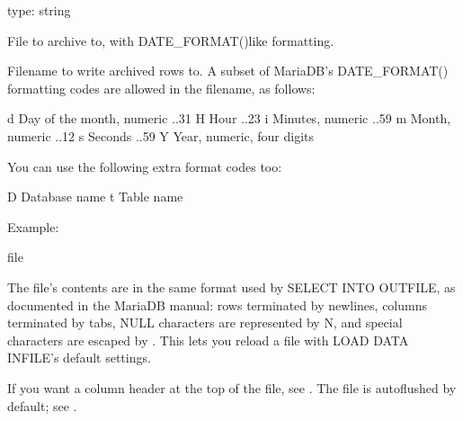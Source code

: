 \documentclass[letterpaper,10pt,english]{sphinxmanual}
\begin{document}
\begin{fulllineitems}
\label{\detokenize{mariadb-archiver:cmdoption-mariadb-archiver-file}}
\sphinxAtStartPar
type: string

\sphinxAtStartPar
File to archive to, with DATE\_FORMAT()\sphinxhyphen{}like formatting.

\sphinxAtStartPar
Filename to write archived rows to.  A subset of MariaDB’s DATE\_FORMAT()
formatting codes are allowed in the filename, as follows:

\begin{sphinxVerbatim}[commandchars=\\\{\}]
\PYGZpc{}d    Day of the month, numeric ..31
\PYGZpc{}H    Hour ..23
\PYGZpc{}i    Minutes, numeric ..59
\PYGZpc{}m    Month, numeric ..12
\PYGZpc{}s    Seconds ..59
\PYGZpc{}Y    Year, numeric, four digits
\end{sphinxVerbatim}

\sphinxAtStartPar
You can use the following extra format codes too:

\begin{sphinxVerbatim}[commandchars=\\\{\}]
\PYGZpc{}D    Database name
\PYGZpc{}t    Table name
\end{sphinxVerbatim}

\sphinxAtStartPar
Example:

\begin{sphinxVerbatim}[commandchars=\\\{\}]
\PYGZhy{}\PYGZhy{}file 
\end{sphinxVerbatim}

\sphinxAtStartPar
The file’s contents are in the same format used by SELECT INTO OUTFILE, as
documented in the MariaDB manual: rows terminated by newlines, columns
terminated by tabs, NULL characters are represented by N, and special
characters are escaped by .  This lets you reload a file with LOAD DATA
INFILE’s default settings.

\sphinxAtStartPar
If you want a column header at the top of the file, see {\hyperref[\detokenize{mariadb-archiver:cmdoption-mariadb-archiver-header}]{}}.  The file
is auto\sphinxhyphen{}flushed by default; see {\hyperref[\detokenize{mariadb-archiver:cmdoption-mariadb-archiver-buffer}]{}}.

\end{fulllineitems}
\end{document}
